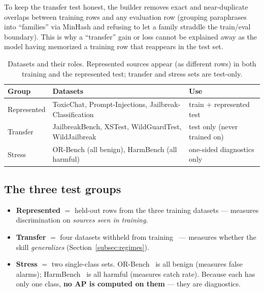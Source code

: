 \documentclass[11pt]{article}
\begin{document}
To keep the transfer test honest, the builder removes exact and near-duplicate overlaps
between training rows and any evaluation row (grouping paraphrases into ``families'' via
MinHash and refusing to let a family straddle the train/eval boundary). This is why a
``transfer'' gain or loss cannot be explained away as the model having memorized a training
row that reappears in the test set.

\begin{table}[t]
\centering\small
\caption{Datasets and their roles. Represented sources appear (as different rows) in both
training and the represented test; transfer and stress sets are test-only.}
\label{tab:data}
\begin{tabular}{lll}
\toprule
Group & Datasets & Use \\
\midrule
Represented & ToxicChat, Prompt-Injections, Jailbreak-Classification & train $+$ represented test \\
Transfer & JailbreakBench, XSTest, WildGuardTest, WildJailbreak & test only (never trained on) \\
Stress & OR-Bench (all benign), HarmBench (all harmful) & one-sided diagnostics only \\
\bottomrule
\end{tabular}
\end{table}

\subsection{The three test groups}
\begin{itemize}
\item \textbf{Represented} $=$ held-out rows from the three training datasets --- measures
discrimination on \emph{sources seen in training}.
\item \textbf{Transfer} $=$ four datasets withheld from training~\cite{chao2024jailbreakbench,rottger2024xstest,han2024wildguard,jiang2024wildteaming}
--- measures whether the skill \emph{generalizes} (Section~\ref{subsec:regimes}).
\item \textbf{Stress} $=$ two single-class sets. OR-Bench~\cite{cui2024orbench} is all benign (measures false
alarms); HarmBench~\cite{mazeika2024harmbench} is all harmful (measures catch rate). Because each has only one class,
\textbf{no AP is computed on them} --- they are diagnostics.
\end{itemize}
\end{document}
